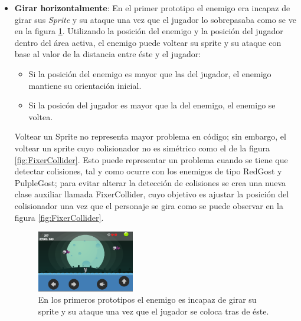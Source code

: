 \begin{itemize}
		 \item \textbf{Girar horizontalmente}: En el primer prototipo el enemigo era 
		 incapaz de girar sus \textit{Sprite} y su ataque una vez que el jugador lo sobrepasaba como se ve en la figura \ref{fig:EnemyBack}. Utilizando la posición del enemigo y la posición del jugador dentro del área activa, el enemigo puede voltear su sprite y su ataque con base al valor de la distancia entre éste y el jugador: 
		 \begin{itemize}
		 	\item Si la posición del enemigo es mayor que las del jugador, el enemigo 
		 	mantiene su orientación inicial. 
		 	\item Si la posicón del jugador es mayor que la del enemigo, el enemigo 
		 	se voltea.
		 \end{itemize}		  

		 Voltear un Sprite no representa mayor problema en código; sin embargo, el 
		 voltear un sprite cuyo colisionador no es simétrico como el de la figura 
		 \ref{fig:FixerCollider}. Esto puede representar un problema cuando se tiene 
		 que detectar colisiones, tal y como ocurre con los enemigos de tipo RedGost y 
		 PulpleGost; para evitar alterar la detección de colisiones se crea una nueva 
		 clase auxiliar llamada FixerCollider,  cuyo objetivo es ajustar la posición 
		 del colisionador una vez que el personaje se gira como se puede observar en 
		 la figura \ref{fig:FixerCollider}.
		 
		 \begin{figure}[h]
    			\centering
    			\includegraphics[width=0.4\textwidth]{03TrabajoRealizado/imagenes/voltearEnemigo01.png}
    			\caption{En los primeros prototipos el enemigo es incapaz de girar su sprite y su ataque una vez que el jugador se coloca tras de éste.}
    			\label{fig:EnemyBack}
		\end{figure}
		
		\begin{figure}[h]
	  		\centering
	   

\end{figure}
\end{itemize}

